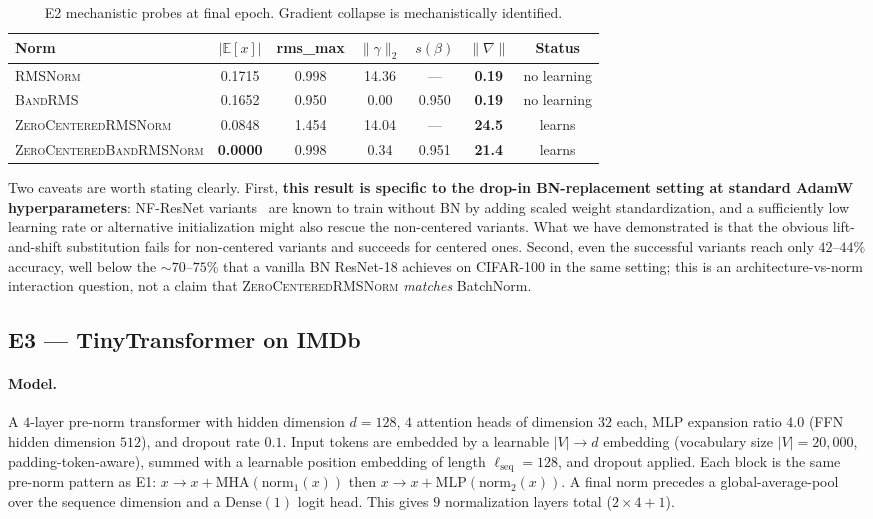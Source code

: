\documentclass{article}
\newcommand{\E}{\mathbb{E}}
\newcommand{\rms}{\textsc{RMSNorm}}
\newcommand{\bandrms}{\textsc{BandRMS}}
\newcommand{\zcrms}{\textsc{ZeroCentered}\-\textsc{RMSNorm}}
\newcommand{\zcband}{\textsc{ZeroCentered}\-\textsc{BandRMSNorm}}
\begin{document}
\begin{table}[H]
\centering
\caption{E2 mechanistic probes at final epoch. Gradient collapse is mechanistically identified.}
\label{tab:e2probe}
\renewcommand{\arraystretch}{1.15}
\begin{tabular}{lcccccc}
\toprule
\textbf{Norm} & \textbf{$|\E[x]|$} & \textbf{rms\_max} & \textbf{$\|\gamma\|_2$} & \textbf{$s(\beta)$} & \textbf{$\|\nabla\|$} & \textbf{Status} \\
\midrule
\rms{}      & 0.1715 & 0.998 & 14.36 & --- & \textbf{\textcolor{failred}{0.19}} & no learning \\
\bandrms{}  & 0.1652 & 0.950 & 0.00  & 0.950 & \textbf{\textcolor{failred}{0.19}} & no learning \\
\zcrms{}    & 0.0848 & 1.454 & 14.04 & --- & \textbf{\textcolor{passgreen}{24.5}} & learns \\
\zcband{}   & \textbf{0.0000} & 0.998 & 0.34  & 0.951 & \textbf{\textcolor{passgreen}{21.4}} & learns \\
\bottomrule
\end{tabular}
\end{table}

Two caveats are worth stating clearly.
First, \textbf{this result is specific to the drop-in BN-replacement setting at standard AdamW hyperparameters}: NF-ResNet variants~\citep{brock2021high} are known to train without BN by adding scaled weight standardization, and a sufficiently low learning rate or alternative initialization might also rescue the non-centered variants.
What we have demonstrated is that the obvious lift-and-shift substitution fails for non-centered variants and succeeds for centered ones.
Second, even the successful variants reach only $42$--$44\%$ accuracy, well below the $\sim 70$--$75\%$ that a vanilla BN ResNet-18 achieves on CIFAR-100 in the same setting; this is an architecture-vs-norm interaction question, not a claim that \zcrms{} \emph{matches} BatchNorm.

\subsection{E3 --- TinyTransformer on IMDb}
\label{sec:e3}

\paragraph{Model.}
A $4$-layer pre-norm transformer with hidden dimension $d{=}128$, $4$ attention heads of dimension $32$ each, MLP expansion ratio $4.0$ (FFN hidden dimension $512$), and dropout rate $0.1$.
Input tokens are embedded by a learnable $|V| \to d$ embedding (vocabulary size $|V| = 20{,}000$, padding-token-aware), summed with a learnable position embedding of length $\ell_{\text{seq}}{=}128$, and dropout applied.
Each block is the same pre-norm pattern as E1: $x \to x + \text{MHA}(\text{norm}_1(x))$ then $x \to x + \text{MLP}(\text{norm}_2(x))$.
A final norm precedes a global-average-pool over the sequence dimension and a $\text{Dense}(1)$ logit head.
This gives $9$ normalization layers total ($2 \times 4 + 1$).
\end{document}
